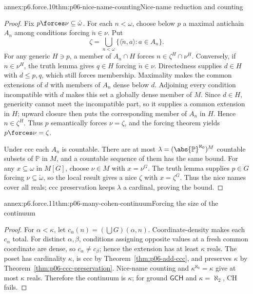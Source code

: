 \begin{annexitem}{annex:p6.force.10}{thm:p06-nice-name-counting}{Nice-name reduction and counting}
\begin{proof}
Fix \(p\forces\nu\subseteq\check\omega\).  For each \(n<\omega\), choose
below \(p\) a maximal antichain \(A_n\) among conditions forcing
\(\check n\in\nu\).  Put
\[
  \zeta=\bigcup_{n<\omega}
  \{\langle\check n,a\rangle:a\in A_n\}.
\]
For any generic \(H\ni p\), a member of \(A_n\cap H\) forces
\(n\in\zeta^H\cap\nu^H\).  Conversely, if \(n\in\nu^H\), the truth lemma
gives \(q\in H\) forcing \(\check n\in\nu\).  Directedness supplies
\(d\in H\) with \(d\leq p,q\), which still forces membership.  Maximality
makes the common extensions of \(d\) with members of \(A_n\) dense below
\(d\).  Adjoining every condition incompatible with \(d\) makes this set a
globally dense member of \(M\).  Since \(d\in H\), genericity cannot meet the
incompatible part, so it supplies a common extension in \(H\); upward closure
then puts the corresponding member of \(A_n\) in \(H\).  Hence
\(n\in\zeta^H\).  Thus
\(p\) semantically forces \(\nu=\zeta\), and the forcing theorem yields
\(p\forces\nu=\zeta\).

Under ccc each \(A_n\) is countable.  There are at most
\(\lambda=(\abs{\mathbb P}^{\aleph_0})^M\) countable subsets of
\(\mathbb P\) in \(M\), and a countable sequence of them has the same bound.
For any \(x\subseteq\omega\) in \(M[G]\), choose \(\nu\in M\) with
\(x=\nu^G\).  The truth lemma supplies \(p\in G\) forcing
\(\nu\subseteq\check\omega\), so the local result gives a nice \(\zeta\)
with \(x=\zeta^G\).  Thus the nice names cover all reals; ccc preservation
keeps \(\lambda\) a cardinal, proving the bound.
\end{proof}
\end{annexitem}

\begin{annexitem}{annex:p6.force.11}{thm:p06-many-cohen-continuum}{Forcing the size of the continuum}
\begin{proof}
For \(\alpha<\kappa\), let
\(c_\alpha(n)=(\bigcup G)(\alpha,n)\).  Coordinate-density makes each
\(c_\alpha\) total.  For distinct \(\alpha,\beta\), conditions assigning
opposite values at a fresh common coordinate are dense, so
\(c_\alpha\neq c_\beta\); hence the
extension has at least \(\kappa\) reals.  The poset has cardinality \(\kappa\),
is ccc by Theorem~\ref{thm:p06-add-ccc}, and preserves \(\kappa\) by
Theorem~\ref{thm:p06-ccc-preservation}.  Nice-name counting and
\(\kappa^{\aleph_0}=\kappa\) give at most \(\kappa\) reals.  Therefore the
continuum is \(\kappa\); for ground \(\mathsf{GCH}\) and
\(\kappa=\aleph_2\), CH fails.
\end{proof}
\end{annexitem}


